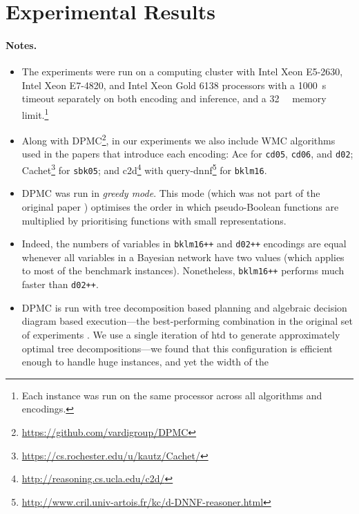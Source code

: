 \documentclass[runningheads]{llncs}
\begin{document}
\section{Experimental Results}

\paragraph{Notes.}
\begin{itemize}
\item The experiments were run on a computing cluster with Intel Xeon E5-2630,
  Intel Xeon E7-4820, and Intel Xeon Gold 6138 processors with a
  \SI{1000}{\second} timeout separately on both encoding and inference, and a
  \SI{32}{\gibi\byte} memory limit.\footnote{Each instance was run on the same
    processor across all algorithms and encodings.}
\item Along with
  \textsf{DPMC}\footnote{\url{https://github.com/vardigroup/DPMC}}, in our
  experiments we also include WMC algorithms used in the papers that introduce
  each encoding: \textsf{Ace}
  for \texttt{cd05}, \texttt{cd06}, and \texttt{d02};
  \textsf{Cachet}\footnote{\url{https://cs.rochester.edu/u/kautz/Cachet/}}
  \cite{DBLP:conf/sat/SangBBKP04} for \texttt{sbk05}; and
  \textsf{c2d}\footnote{\url{http://reasoning.cs.ucla.edu/c2d/}}
  \cite{DBLP:conf/ecai/Darwiche04} with
  \textsf{query-dnnf}\footnote{\url{http://www.cril.univ-artois.fr/kc/d-DNNF-reasoner.html}}
  for \texttt{bklm16}.
\item \textsf{DPMC} was run in \emph{greedy mode}. This mode (which was not part
  of the original paper \cite{DBLP:conf/cp/DudekPV20}) optimises the order in
  which pseudo-Boolean functions are multiplied by prioritising functions with
  small representations.
\item Indeed, the numbers of variables in \texttt{bklm16++} and \texttt{d02++}
  encodings are equal whenever all variables in a Bayesian network have two
  values (which applies to most of the benchmark instances). Nonetheless,
  \texttt{bklm16++} performs much faster than \texttt{d02++}.
\item \textsf{DPMC} is run with tree decomposition based planning and algebraic
  decision diagram based execution---the best-performing combination in the
  original set of experiments \cite{DBLP:conf/cp/DudekPV20}. We use a single
  iteration of \textsf{htd} \cite{DBLP:conf/cpaior/AbseherMW17} to generate
  approximately optimal tree decompositions---we found that this configuration
  is efficient enough to handle huge instances, and yet the width of the

\end{itemize}
\end{document}
